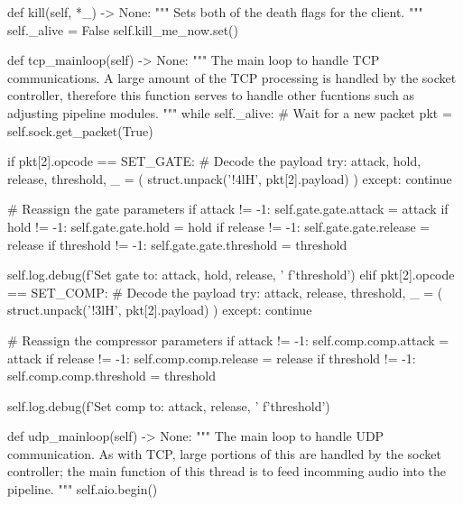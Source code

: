 \begin{pythoncode}
    def kill(self, *_) -> None:
        """
        Sets both of the death flags for the client.
        """
        self._alive = False
        self.kill_me_now.set()

    def tcp_mainloop(self) -> None:
        """
        The main loop to handle TCP communications.
        A large amount of the TCP processing is handled by the socket
        controller, therefore this function serves to handle other fucntions
        such as adjusting pipeline modules.
        """
        while self._alive:
            # Wait for a new packet
            pkt = self.sock.get_packet(True)

            if pkt[2].opcode == SET_GATE:
                # Decode the payload
                try:
                    attack, hold, release, threshold, _ = (
                        struct.unpack('!4lH', pkt[2].payload)
                    )
                except:
                    continue

                # Reassign the gate parameters
                if attack != -1:
                    self.gate.gate.attack = attack
                if hold != -1:
                    self.gate.gate.hold = hold
                if release != -1:
                    self.gate.gate.release = release
                if threshold != -1:
                    self.gate.gate.threshold = threshold

                self.log.debug(f'Set gate to: {attack}, {hold}, {release}, '
                               f'{threshold}')
            elif pkt[2].opcode == SET_COMP:
                # Decode the payload
                try:
                    attack, release, threshold, _ = (
                        struct.unpack('!3lH', pkt[2].payload)
                    )
                except:
                    continue

                # Reassign the compressor parameters
                if attack != -1:
                    self.comp.comp.attack = attack
                if release != -1:
                    self.comp.comp.release = release
                if threshold != -1:
                    self.comp.comp.threshold = threshold

                self.log.debug(f'Set comp to: {attack}, {release}, '
                               f'{threshold}')

    def udp_mainloop(self) -> None:
        """
        The main loop to handle UDP communication.
        As with TCP, large portions of this are handled by the socket
        controller; the main function of this thread is to feed incomming
        audio into the pipeline.
        """
        self.aio.begin()


\end{pythoncode}
